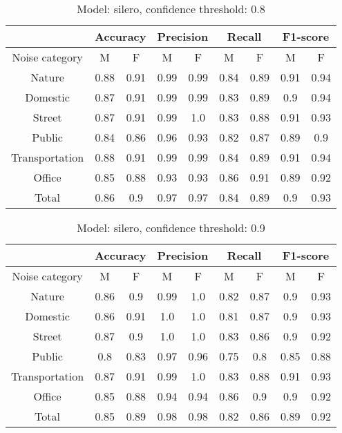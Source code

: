 \documentclass[../main.tex]{subfiles}
\begin{document}
    \begin{table}[H]
    \centering
    \small
    \begin{tabular}{ |c|c|c|c|c|c|c|c|c| }
    \hline
     &\multicolumn{2}{|c|}{Accuracy}&\multicolumn{2}{|c|}{Precision}&\multicolumn{2}{|c|}{Recall}&\multicolumn{2}{|c|}{F1-score} \\ 
    \hline
    Noise category & M & F & M & F & M & F & M & F \\ 
    \hline
    Nature & 0.88 & 0.91 & 0.99 & 0.99 & 0.84 & 0.89 & 0.91 & 0.94 \\ 
    Domestic & 0.87 & 0.91 & 0.99 & 0.99 & 0.83 & 0.89 & 0.9 & 0.94 \\ 
    Street & 0.87 & 0.91 & 0.99 & 1.0 & 0.83 & 0.88 & 0.91 & 0.93 \\ 
    Public & 0.84 & 0.86 & 0.96 & 0.93 & 0.82 & 0.87 & 0.89 & 0.9 \\ 
    Transportation & 0.88 & 0.91 & 0.99 & 0.99 & 0.84 & 0.89 & 0.91 & 0.94 \\ 
    Office & 0.85 & 0.88 & 0.93 & 0.93 & 0.86 & 0.91 & 0.89 & 0.92 \\ 
    Total & 0.86 & 0.9 & 0.97 & 0.97 & 0.84 & 0.89 & 0.9 & 0.93 \\ 
    \hline
    \end{tabular}
    \caption{Model: silero, confidence threshold: 0.8}
    \end{table}
    
    \begin{table}[H]
    \centering
    \small
    \begin{tabular}{ |c|c|c|c|c|c|c|c|c| }
    \hline
     &\multicolumn{2}{|c|}{Accuracy}&\multicolumn{2}{|c|}{Precision}&\multicolumn{2}{|c|}{Recall}&\multicolumn{2}{|c|}{F1-score} \\ 
    \hline
    Noise category & M & F & M & F & M & F & M & F \\ 
    \hline
    Nature & 0.86 & 0.9 & 0.99 & 1.0 & 0.82 & 0.87 & 0.9 & 0.93 \\ 
    Domestic & 0.86 & 0.91 & 1.0 & 1.0 & 0.81 & 0.87 & 0.9 & 0.93 \\ 
    Street & 0.87 & 0.9 & 1.0 & 1.0 & 0.83 & 0.86 & 0.9 & 0.92 \\ 
    Public & 0.8 & 0.83 & 0.97 & 0.96 & 0.75 & 0.8 & 0.85 & 0.88 \\ 
    Transportation & 0.87 & 0.91 & 0.99 & 1.0 & 0.83 & 0.88 & 0.91 & 0.93 \\ 
    Office & 0.85 & 0.88 & 0.94 & 0.94 & 0.86 & 0.9 & 0.9 & 0.92 \\ 
    Total & 0.85 & 0.89 & 0.98 & 0.98 & 0.82 & 0.86 & 0.89 & 0.92 \\ 
    \hline
    \end{tabular}
    \caption{Model: silero, confidence threshold: 0.9}
    \end{table}
    
\end{document}
